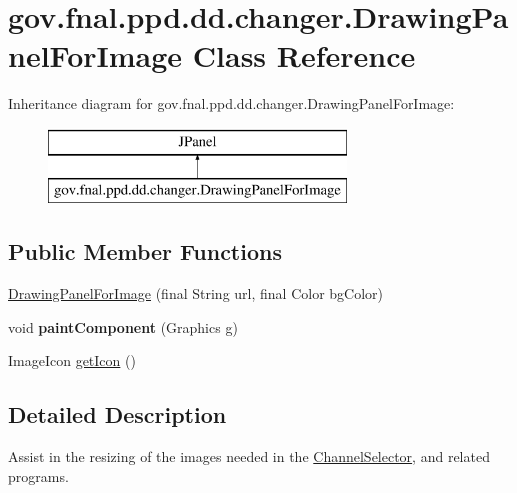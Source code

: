 \hypertarget{classgov_1_1fnal_1_1ppd_1_1dd_1_1changer_1_1DrawingPanelForImage}{\section{gov.\-fnal.\-ppd.\-dd.\-changer.\-Drawing\-Panel\-For\-Image Class Reference}
\label{classgov_1_1fnal_1_1ppd_1_1dd_1_1changer_1_1DrawingPanelForImage}
}
Inheritance diagram for gov.\-fnal.\-ppd.\-dd.\-changer.\-Drawing\-Panel\-For\-Image\-:\begin{figure}[H]
\begin{center}
\leavevmode
\includegraphics[height=2.000000cm]{classgov_1_1fnal_1_1ppd_1_1dd_1_1changer_1_1DrawingPanelForImage}
\end{center}
\end{figure}
\subsection*{Public Member Functions}
\begin{DoxyCompactItemize}
\item 
\hyperlink{classgov_1_1fnal_1_1ppd_1_1dd_1_1changer_1_1DrawingPanelForImage_a744ff322c9e8fe0decb1ac2bc61e18a5}{Drawing\-Panel\-For\-Image} (final String url, final Color bg\-Color)
\item 
\hypertarget{classgov_1_1fnal_1_1ppd_1_1dd_1_1changer_1_1DrawingPanelForImage_a54d6ead6292aeea4b6ba3db069e3c23d}{void {\bfseries paint\-Component} (Graphics g)}\label{classgov_1_1fnal_1_1ppd_1_1dd_1_1changer_1_1DrawingPanelForImage_a54d6ead6292aeea4b6ba3db069e3c23d}

\item 
Image\-Icon \hyperlink{classgov_1_1fnal_1_1ppd_1_1dd_1_1changer_1_1DrawingPanelForImage_a938a2167687485031b3a4ab35eedeebe}{get\-Icon} ()
\end{DoxyCompactItemize}


\subsection{Detailed Description}
Assist in the resizing of the images needed in the \hyperlink{classgov_1_1fnal_1_1ppd_1_1dd_1_1ChannelSelector}{Channel\-Selector}, and related programs.

